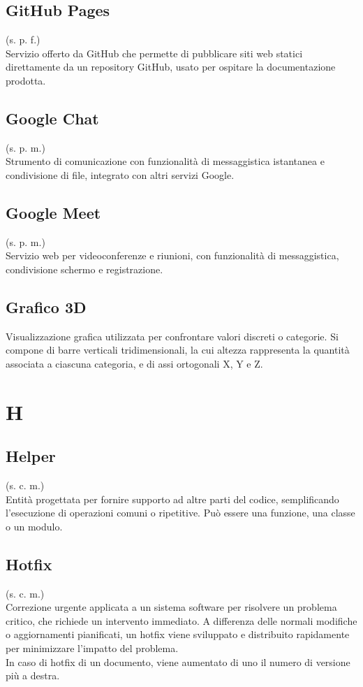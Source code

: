     \subsection{GitHub Pages}
    \label{GitHub Pages}
    (s. p. f.)\\
    Servizio offerto da GitHub che permette di pubblicare siti web statici direttamente da un repository GitHub,
    usato per ospitare la documentazione prodotta.
    \subsection{Google Chat}
    (s. p. m.)\\
    Strumento di comunicazione con funzionalità di messaggistica
    istantanea e condivisione di file, integrato con altri servizi Google.
    \subsection{Google Meet}    
    (s. p. m.)\\
    Servizio web per videoconferenze e riunioni, con funzionalità di messaggistica,
    condivisione schermo e registrazione.
    \subsection{Grafico 3D}
    Visualizzazione grafica utilizzata per confrontare valori discreti o categorie. 
    Si compone di barre verticali tridimensionali, la cui altezza rappresenta la 
    quantità associata a ciascuna categoria, e di assi ortogonali X, Y e Z. 
\pagebreak
\section{H}
    \subsection{Helper}
    (s. c. m.)\\
    Entità progettata per fornire supporto ad altre parti del codice, 
    semplificando l'esecuzione di operazioni comuni o ripetitive.
    Può essere una funzione, una classe o un modulo.
    \subsection{Hotfix}
    (s. c. m.)\\
    Correzione urgente applicata a un sistema software per risolvere un problema critico, 
    che richiede un intervento immediato. A differenza delle normali modifiche o aggiornamenti pianificati, 
    un hotfix viene sviluppato e distribuito rapidamente per minimizzare l'impatto del problema.\\
    In caso di hotfix di un documento, viene aumentato di uno il numero di versione più a destra.
